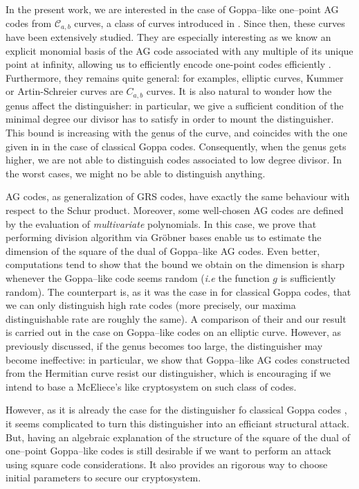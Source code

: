 \documentclass[a4paper]{article}
\theoremstyle{definition}
\theoremstyle{remark}
\newcommand{\calC}{\mathcal{C}}
\begin{document}
In the present work, we are interested in the case of Goppa--like one--point AG codes from $\calC_{a,b}$ curves, a class of curves introduced in \cite{Miu93}. Since then, these curves have been extensively studied. They are especially interesting as we know an explicit monomial basis of the AG code associated with any multiple of its unique point at infinity, allowing us to efficiently encode one-point codes  efficiently \cite{BRS21}. Furthermore, they remains quite general: for examples, elliptic curves, Kummer or Artin-Schreier curves are $C_{a,b}$ curves. It is also natural to wonder how the genus affect the distinguisher: in particular, we give a sufficient condition of the minimal degree our divisor has to satisfy in order to mount the distinguisher. This bound is increasing with the genus of the curve, and coincides with the one given in \cite{MT21} in the case of classical Goppa codes. Consequently, when the genus gets higher, we are not able to distinguish codes associated to low degree divisor. In the worst cases, we might no be able to distinguish anything.

AG codes, as generalization of GRS codes, have exactly the same behaviour with respect to the Schur product. Moreover, some well-chosen AG codes are defined by the evaluation of \textit{multivariate} polynomials. In this case, we prove that performing division algorithm via Gröbner bases enable us to estimate the dimension of the square of the dual of Goppa--like AG codes. Even better, computations tend to show that the bound we obtain on the dimension is sharp whenever the Goppa--like code seems random (\emph{i.e} the function $g$ is sufficiently random). The counterpart is, as it was the case in \cite{MT21} for classical Goppa codes, that we can only distinguish high rate codes (more precisely, our maxima distinguishable rate are roughly the same). A comparison of their and our result is carried out in the case on Goppa--like codes on an elliptic curve. However, as previously discussed, if the genus becomes too large, the distinguisher may become ineffective: in particular, we show that Goppa--like AG codes constructed from the Hermitian curve resist our distinguisher, which is encouraging if we intend to base a McEliece's like cryptosystem on such class of codes.

However, as it is already the case for the distinguisher fo classical Goppa codes \cite{MT21}, it seems complicated to turn this distinguisher into an efficiant structural attack. But, having an algebraic explanation of the structure of the square of the dual of one--point Goppa--like codes is still desirable if we want to perform an attack using square code considerations. It also provides an rigorous way to choose initial parameters to secure our cryptosystem.
\end{document}
